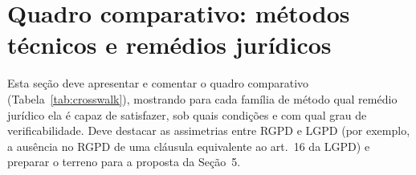 \section{Quadro comparativo: métodos técnicos e remédios jurídicos}


Esta seção deve apresentar e comentar o quadro comparativo
(Tabela~\ref{tab:crosswalk}), mostrando para cada família de método qual
remédio jurídico ela é capaz de satisfazer, sob quais condições e com qual
grau de verificabilidade. Deve destacar as assimetrias entre RGPD e LGPD
(por exemplo, a ausência no RGPD de uma cláusula equivalente ao art.~16 da
LGPD) e preparar o terreno para a proposta da Seção~5.



